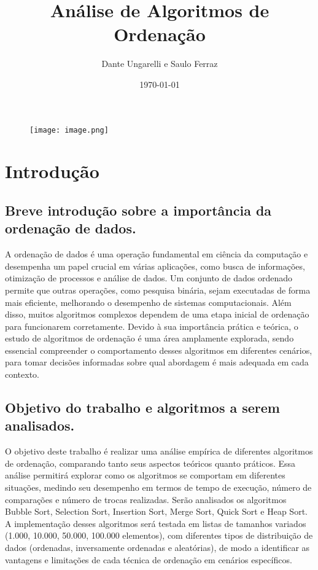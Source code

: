 \documentclass[a4paper,12pt]{article}
\title{Análise de Algoritmos de Ordenação}
\author{Dante Ungarelli e Saulo Ferraz}
\date{\today}
\begin{document}
\begin{figure}
    \centering
    \texttt{[image: image.png]}
\end{figure}


\maketitle

\section{Introdução}
\subsection{Breve introdução sobre a importância da ordenação de dados.}
A ordenação de dados é uma operação fundamental em ciência da computação e desempenha um papel crucial em várias aplicações, como busca de informações, otimização de processos e análise de dados. Um conjunto de dados ordenado permite que outras operações, como pesquisa binária, sejam executadas de forma mais eficiente, melhorando o desempenho de sistemas computacionais. Além disso, muitos algoritmos complexos dependem de uma etapa inicial de ordenação para funcionarem corretamente. Devido à sua importância prática e teórica, o estudo de algoritmos de ordenação é uma área amplamente explorada, sendo essencial compreender o comportamento desses algoritmos em diferentes cenários, para tomar decisões informadas sobre qual abordagem é mais adequada em cada contexto.
\subsection{Objetivo do trabalho e algoritmos a serem analisados.}
O objetivo deste trabalho é realizar uma análise empírica de diferentes algoritmos de ordenação, comparando tanto seus aspectos teóricos quanto práticos. Essa análise permitirá explorar como os algoritmos se comportam em diferentes situações, medindo seu desempenho em termos de tempo de execução, número de comparações e número de trocas realizadas. Serão analisados os algoritmos Bubble Sort, Selection Sort, Insertion Sort, Merge Sort, Quick Sort e Heap Sort. A implementação desses algoritmos será testada em listas de tamanhos variados (1.000, 10.000, 50.000, 100.000 elementos), com diferentes tipos de distribuição de dados (ordenadas, inversamente ordenadas e aleatórias), de modo a identificar as vantagens e limitações de cada técnica de ordenação em cenários específicos.
\end{document}
